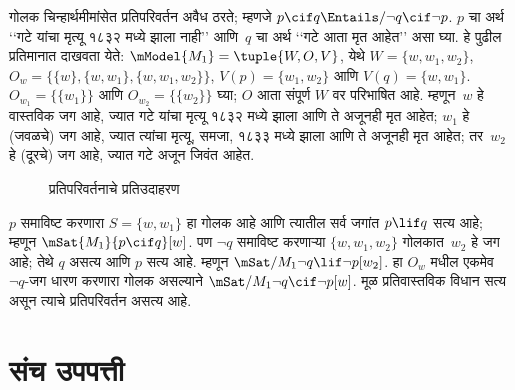 \begin{ex}\label{cnt:min:cpo:ex:contraposition-counterex}
  गोलक चिन्हार्थमीमांसेत
  प्रतिपरिवर्तन अवैध ठरते;
  म्हणजे
  $p \cif q \Entails/
  \lnot q \cif \lnot p$.
  $p$ चा अर्थ ‘‘गटे
  यांचा मृत्यू १८३२
  मध्ये झाला नाही’’
  आणि~$q$ चा अर्थ
  ‘‘गटे आता मृत
  आहेत’’ असा घ्या.
  हे पुढील प्रतिमानात
  दाखवता येते:
  $\mModel{M_1} = \tuple{W, O, V}$,
  येथे $W =
  \{w, w_1, w_2\}$,
  $O_w = \{\{w\}, \{w, w_1\},
  \{w, w_1, w_2\}\}$,
  $V(p) = \{w_1, w_2\}$
  आणि $V(q) = \{w, w_1\}$.
  $O_{w_1}=\{\{w_1\}\}$ आणि $O_{w_2}=\{\{w_2\}\}$ घ्या;
  $O$ आता संपूर्ण $W$ वर परिभाषित आहे.
  म्हणून~$w$ हे वास्तविक
  जग आहे, ज्यात गटे
  यांचा मृत्यू १८३२
  मध्ये झाला आणि
  ते अजूनही मृत आहेत;
  $w_1$ हे (जवळचे)
  जग आहे, ज्यात
  त्यांचा मृत्यू,
  समजा, १८३३ मध्ये
  झाला आणि ते
  अजूनही मृत आहेत;
  तर~$w_2$ हे
  (दूरचे) जग आहे,
  ज्यात गटे
  अजून जिवंत आहेत.
\begin{figure}
\begin{center}
\caption{प्रतिपरिवर्तनाचे प्रतिउदाहरण}
\label{cnt:min:cpo:fig:contraposition}
\end{center}
\end{figure}
$p$ समाविष्ट करणारा
$S = \{w, w_1\}$
हा गोलक आहे आणि
त्यातील सर्व जगांत
$p \lif q$ सत्य आहे;
म्हणून
$\mSat{M_1}{p \cif q}[w]$.
पण $\lnot q$
समाविष्ट करणाऱ्या
$\{w, w_1, w_2\}$
गोलकात~$w_2$
हे जग आहे; तेथे
$q$ असत्य आणि
$p$ सत्य आहे.
म्हणून
$\mSat/{M_1}{\lnot q
\lif \lnot p}[w_2]$. हा $O_w$ मधील एकमेव $\lnot q$-जग
धारण करणारा गोलक असल्याने
$\mSat/{M_1}{\lnot q\cif\lnot p}[w]$.
मूळ प्रतिवास्तविक विधान सत्य असून त्याचे प्रतिपरिवर्तन असत्य आहे.
\end{ex}



\part{संच उपपत्ती}\label{sth:::part}\label{sth:part}
